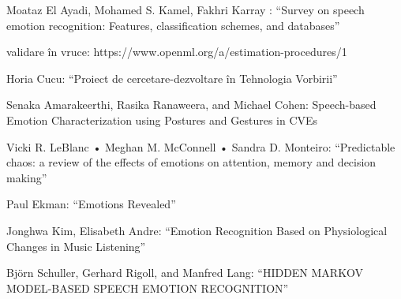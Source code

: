 \documentclass[9pt,shortpaper,twoside,web]{ieeecolor}
\begin{document}
\begin{thebibliography}{00}

 Moataz El Ayadi, Mohamed S. Kamel, Fakhri Karray : ``Survey on speech emotion recognition: Features, classification schemes, and databases''

 validare în vruce: https://www.openml.org/a/estimation-procedures/1

 Horia Cucu: ``Proiect de cercetare-dezvoltare în Tehnologia Vorbirii''

 Senaka Amarakeerthi, Rasika Ranaweera, and Michael Cohen: Speech-based Emotion Characterization using Postures and Gestures in CVEs

 Vicki R. LeBlanc • Meghan M. McConnell • Sandra D. Monteiro: ``Predictable chaos: a review of the effects of emotions on attention, memory and decision making''

 Paul Ekman: ``Emotions Revealed''

 Jonghwa Kim, Elisabeth Andre: ``Emotion Recognition Based on Physiological Changes in Music Listening''

 Björn Schuller, Gerhard Rigoll, and Manfred Lang: ``HIDDEN MARKOV MODEL-BASED SPEECH EMOTION RECOGNITION''

\end{thebibliography}
\end{document}
